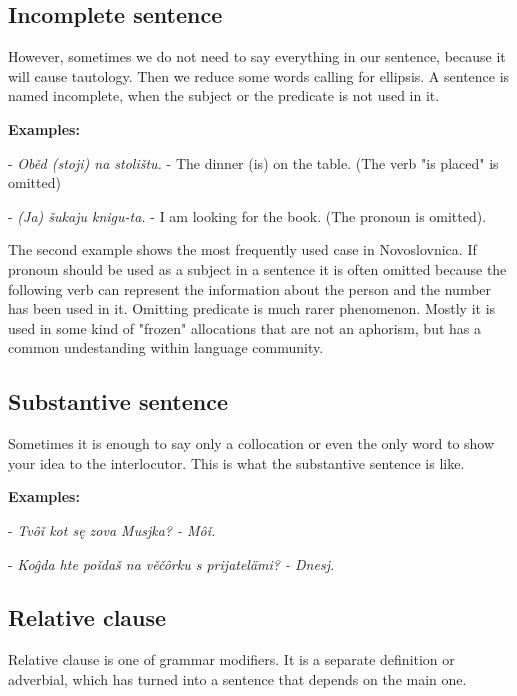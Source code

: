 \subsection{Incomplete sentence}

However, sometimes we do not need to say everything in our sentence, because it will cause tautology. Then we reduce some words calling for ellipsis. A sentence is named incomplete, when the subject or the predicate is not used in it.

\textbf{Examples:}

- \textit{Oběd (stoji) na stolištu.} - The dinner (is) on the table. (The verb "is placed" is omitted)

- \textit{(Ja) šukaju knigu-ta.} - I am looking for the book. (The pronoun is omitted).

The second example shows the most frequently used case in Novoslovnica. If pronoun should be used as a subject in a sentence it is often omitted because the following verb can represent the information about the person and the number has been used in it. Omitting predicate is much rarer phenomenon. Mostly it is used in some kind of "frozen" allocations that are not an aphorism, but has a common undestanding within language community.

\subsection{Substantive sentence}

Sometimes it is enough to say only a collocation or even the only word to show your idea to the interlocutor. This is what the substantive sentence is like.

\textbf{Examples:}

- \textit{Tvôǐ kot sę zova Musjka? - Môǐ.}

- \textit{Koĝda hte poǐdaš na věčôrku s prijatelämi? - Dnesj.}

\subsection{Relative clause}

Relative clause is one of grammar modifiers. It is a separate definition or adverbial, which has turned into a sentence that depends on the main one.
